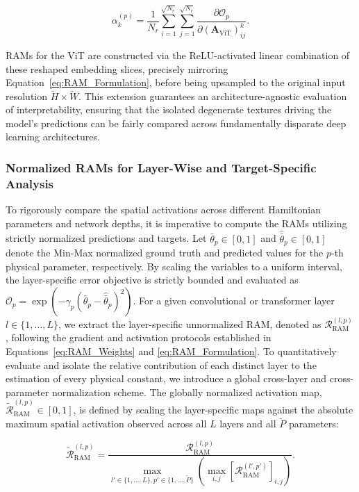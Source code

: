 \documentclass[final,5p,times,twocolumn]{elsarticle}
\begin{document}
\begin{equation}\label{eq:ViT_Weights}
\alpha_k^{(p)} = \frac{1}{N_r} \sum_{i=1}^{\sqrt{N_r}} \sum_{j=1}^{\sqrt{N_r}} \frac{\partial \mathcal{O}_p}{\partial (\mathbf{A}_{\text{ViT}})_{ij}^k}.
\end{equation}

RAMs for the ViT are constructed via the ReLU-activated linear combination of these reshaped embedding slices, precisely mirroring Equation~\ref{eq:RAM_Formulation}, before being upsampled to the original input resolution $\breve{H} \times \breve{W}$. This extension guarantees an architecture-agnostic evaluation of interpretability, ensuring that the isolated degenerate textures driving the model's predictions can be fairly compared across fundamentally disparate deep learning architectures.

\subsubsection{Normalized RAMs for Layer-Wise and Target-Specific Analysis}\label{sec:Nor_RAMs}

To rigorously compare the spatial activations across different Hamiltonian parameters and network depths, it is imperative to compute the RAMs utilizing strictly normalized predictions and targets. Let $\bar{\theta}_p \in [0,1]$ and $\hat{\bar{\theta}}_p \in [0,1]$ denote the Min-Max normalized ground truth and predicted values for the $p$-th physical parameter, respectively. By scaling the variables to a uniform interval, the layer-specific error objective is strictly bounded and evaluated as $\mathcal{O}_p = \exp(-\gamma_p (\bar{\theta}_p - \hat{\bar{\theta}}_p)^2)$. For a given convolutional or transformer layer $l \in \{1, \dots, L\}$, we extract the layer-specific unnormalized RAM, denoted as $\mathcal{R}_{\text{RAM}}^{(l,p)}$, following the gradient and activation protocols established in Equations~\ref{eq:RAM_Weights} and \ref{eq:RAM_Formulation}. To quantitatively evaluate and isolate the relative contribution of each distinct layer to the estimation of every physical constant, we introduce a global cross-layer and cross-parameter normalization scheme. The globally normalized activation map, $\tilde{\mathcal{R}}_{\text{RAM}}^{(l,p)}\in[0,1]$, is defined by scaling the layer-specific maps against the absolute maximum spatial activation observed across all $L$ layers and all $\breve{P}$ parameters:

\begin{equation}\label{eq:RAM_Global_Norm}
\tilde{\mathcal{R}}_{\text{RAM}}^{(l,p)} = \frac{\mathcal{R}_{\text{RAM}}^{(l,p)}}{\max\limits_{l' \in \{1,\dots,L\}, p' \in \{1,\dots,\breve{P}\}} \left( \max\limits_{i,j} \left[ \mathcal{R}_{\text{RAM}}^{(l',p')}\right]_{i,j} \right)}.
\end{equation}
\end{document}
